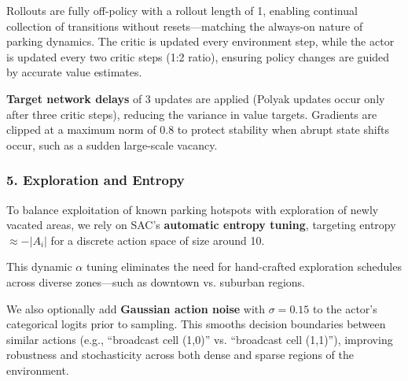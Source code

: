 Rollouts are fully off-policy with a rollout length of 1, enabling continual collection of transitions without resets—matching the always-on nature of parking dynamics. The critic is updated every environment step, while the actor is updated every two critic steps (1:2 ratio), ensuring policy changes are guided by accurate value estimates.

\textbf{Target network delays} of 3 updates are applied (Polyak updates occur only after three critic steps), reducing the variance in value targets. Gradients are clipped at a maximum norm of 0.8 to protect stability when abrupt state shifts occur, such as a sudden large-scale vacancy.

\vspace{1em}

\subsubsection*{5. Exploration and Entropy}

To balance exploitation of known parking hotspots with exploration of newly vacated areas, we rely on SAC’s \textbf{automatic entropy tuning}, targeting entropy \( \approx -|A_i| \) for a discrete action space of size around 10.

This dynamic \( \alpha \) tuning eliminates the need for hand-crafted exploration schedules across diverse zones—such as downtown vs. suburban regions.

We also optionally add \textbf{Gaussian action noise} with \( \sigma = 0.15 \) to the actor’s categorical logits prior to sampling. This smooths decision boundaries between similar actions (e.g., “broadcast cell (1,0)” vs. “broadcast cell (1,1)”), improving robustness and stochasticity across both dense and sparse regions of the environment.
